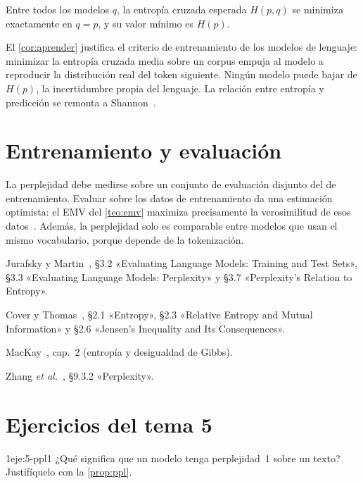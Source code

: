 \begin{corolario}\label{cor:aprender}
Entre todos los modelos $q$, la entropía cruzada esperada $H(p,q)$ se minimiza exactamente en $q=p$, y su valor mínimo es $H(p)$.
\end{corolario}

El \cref{cor:aprender} justifica el criterio de entrenamiento de los modelos de lenguaje: minimizar la entropía cruzada media sobre un corpus empuja al modelo a reproducir la distribución real del token siguiente. Ningún modelo puede bajar de $H(p)$, la incertidumbre propia del lenguaje. La relación entre entropía y predicción se remonta a Shannon~\cite{shannon}.

\section{Entrenamiento y evaluación}

\begin{observacion}
La perplejidad debe medirse sobre un conjunto de evaluación disjunto del de entrenamiento. Evaluar sobre los datos de entrenamiento da una estimación optimista: el EMV del \cref{teo:emv} maximiza precisamente la verosimilitud de esos datos~\cite[§3.2]{jm3}. Además, la perplejidad solo es comparable entre modelos que usan el mismo vocabulario, porque depende de la tokenización.
\end{observacion}

\begin{lecturas}
\item Jurafsky y Martin~\cite{jm3}, §3.2 «Evaluating Language Models: Training and Test Sets», §3.3 «Evaluating Language Models: Perplexity» y §3.7 «Perplexity's Relation to Entropy».
\item Cover y Thomas~\cite{ct}, §2.1 «Entropy», §2.3 «Relative Entropy and Mutual Information» y §2.6 «Jensen's Inequality and Its Consequences».
\item MacKay~\cite{mackay}, cap.~2 (entropía y desigualdad de Gibbs).
\item Zhang \emph{et al.}~\cite{d2l}, §9.3.2 «Perplexity».
\end{lecturas}

\section*{Ejercicios del tema 5}

\begin{ejercicio}{1}{eje:5-ppl1}
¿Qué significa que un modelo tenga perplejidad~1 sobre un texto? Justifíquelo con la \cref{prop:ppl}.
\end{ejercicio}


